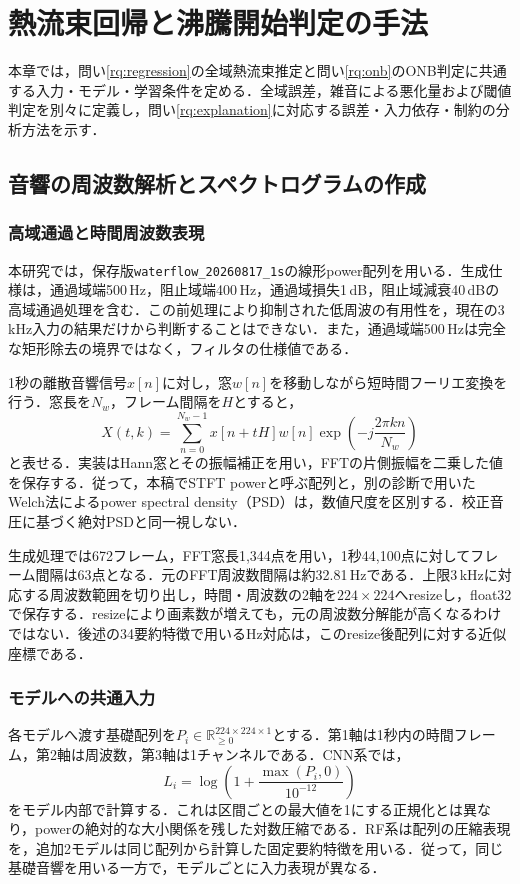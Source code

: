 \chapter{熱流束回帰と沸騰開始判定の手法}\label{ch:methods}
本章では，問い\ref{rq:regression}の全域熱流束推定と問い\ref{rq:onb}のONB判定に共通する入力・モデル・学習条件を定める．全域誤差，雑音による悪化量および閾値判定を別々に定義し，問い\ref{rq:explanation}に対応する誤差・入力依存・制約の分析方法を示す．
\section{音響の周波数解析とスペクトログラムの作成}
\subsection{高域通過と時間周波数表現}
本研究では，保存版\texttt{waterflow\_20260817\_1s}の線形power配列を用いる．生成仕様\cite{localData}は，通過域端500\,Hz，阻止域端400\,Hz，通過域損失1\,dB，阻止域減衰40\,dBの高域通過処理を含む．この前処理により抑制された低周波の有用性を，現在の3\,kHz入力の結果だけから判断することはできない．また，通過域端500\,Hzは完全な矩形除去の境界ではなく，フィルタの仕様値である．

1秒の離散音響信号$x[n]$に対し，窓$w[n]$を移動しながら短時間フーリエ変換を行う．窓長を$N_w$，フレーム間隔を$H$とすると，
\begin{equation}
 X(t,k)=\sum_{n=0}^{N_w-1} x[n+tH]w[n]\exp\left(-j\frac{2\pi kn}{N_w}\right)
\end{equation}
と表せる．実装はHann窓とその振幅補正を用い，FFTの片側振幅を二乗した値を保存する．従って，本稿でSTFT powerと呼ぶ配列と，別の診断で用いたWelch法によるpower spectral density（PSD）は，数値尺度を区別する．校正音圧に基づく絶対PSDと同一視しない．

生成処理では672フレーム，FFT窓長1,344点を用い，1秒44,100点に対してフレーム間隔は63点となる．元のFFT周波数間隔は約32.81\,Hzである．上限3\,kHzに対応する周波数範囲を切り出し，時間・周波数の2軸を$224\times224$へresizeし，float32で保存する．resizeにより画素数が増えても，元の周波数分解能が高くなるわけではない．後述の34要約特徴で用いるHz対応は，このresize後配列に対する近似座標である．

\subsection{モデルへの共通入力}
各モデルへ渡す基礎配列を$P_i\in\mathbb{R}_{\ge0}^{224\times224\times1}$とする．第1軸は1秒内の時間フレーム，第2軸は周波数，第3軸は1チャンネルである．CNN系では，
\begin{equation}\label{eq:logpower}
 L_i=\log\left(1+\frac{\max(P_i,0)}{10^{-12}}\right)
\end{equation}
をモデル内部で計算する．これは区間ごとの最大値を1にする正規化とは異なり，powerの絶対的な大小関係を残した対数圧縮である．RF系は配列の圧縮表現を，追加2モデルは同じ配列から計算した固定要約特徴を用いる．従って，同じ基礎音響を用いる一方で，モデルごとに入力表現が異なる．

